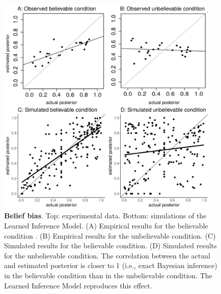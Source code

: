 \begin{figure}
\centering
  \includegraphics[width=0.95\textwidth]{figures/cohenetal.pdf}
  \caption{\textbf{Belief bias}. Top: experimental data. Bottom: simulations of the Learned Inference Model. (A) Empirical results for the believable condition \citep{cohen2017beliefs}. (B) Empirical results for the unbelievable condition. (C) Simulated results for the believable condition. (D) Simulated results for the unbelievable condition. The correlation between the actual and estimated posterior is closer to 1 (i.e., exact Bayesian inference) in the believable condition than in the unbelievable condition. The Learned Inference Model reproduces this effect.
  }
  \label{fig:cohen}
\end{figure}

